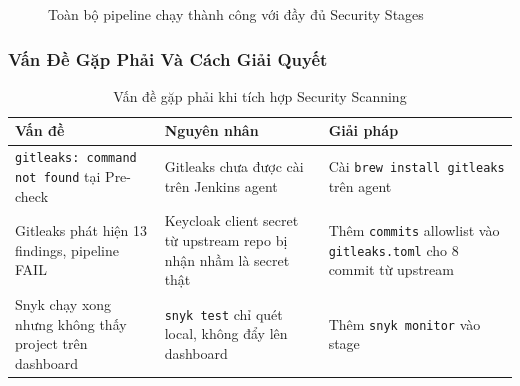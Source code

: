 \begin{figure}[H]
\centering
{}
\caption{Toàn bộ pipeline chạy thành công với đầy đủ Security Stages}
\end{figure}

\subsubsection{Vấn Đề Gặp Phải Và Cách Giải Quyết}

\begin{table}[H]
\centering
\caption{Vấn đề gặp phải khi tích hợp Security Scanning}
\begin{tabular}{|p{4.5cm}|p{4.5cm}|p{4.5cm}|}
\hline
\textbf{Vấn đề} & \textbf{Nguyên nhân} & \textbf{Giải pháp} \\
\hline
\texttt{gitleaks: command not found} tại Pre-check & Gitleaks chưa được cài trên Jenkins agent & Cài \texttt{brew install gitleaks} trên agent \\
\hline
Gitleaks phát hiện 13 findings, pipeline FAIL & Keycloak client secret từ upstream repo bị nhận nhầm là secret thật & Thêm \texttt{commits} allowlist vào \texttt{gitleaks.toml} cho 8 commit từ upstream \\
\hline
Snyk chạy xong nhưng không thấy project trên dashboard & \texttt{snyk test} chỉ quét local, không đẩy lên dashboard & Thêm \texttt{snyk monitor} vào stage \\
\hline
\end{tabular}
\end{table}
